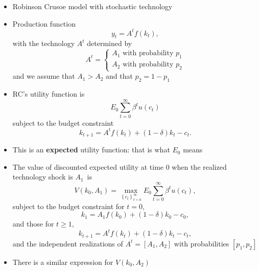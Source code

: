 \documentclass[notes=show]{beamer}
\begin{document}
\begin{frame}%


\begin{itemize}
\item Robinson Crusoe model with stochastic technology

\item Production function%
\[
y_{t}=A^{t}f(k_{t}), 
\]%
with the technology $A^{t}$ determined by 
\[
A^{t}=\left\{ 
\begin{array}{c}
A_{1}\text{ with probability }p_{1} \\ 
A_{2}\text{ with probability }p_{2}%
\end{array}%
\right. 
\]%
and we assume that $A_{1}>A_{2}$ and that $p_{2}=1-p_{1}$

\item RC's utility function is%
\[
E_{0}\sum_{t=0}^{\infty }\beta ^{t}u(c_{t}) 
\]%
subject to the budget constraint%
\[
k_{t+1}=A^{t}f(k_{t})+(1-\delta )k_{t}-c_{t}. 
\]

\item This is an \textbf{expected} utility function: that is what $E_{0}$
means
\end{itemize}

\end{frame}%

\begin{frame}%


\begin{itemize}
\item The value of discounted expected utility at time $0$ when the realized
technology shock is $A_{1}$\ is%
\[
V(k_{0},A_{1})=\max_{\left\{ c_{t}\right\} _{t=0}^{\infty
}}E_{0}\sum_{t=0}^{\infty }\beta ^{t}u(c_{t}),
\]%
subject to the budget constraint for $t=0$,%
\[
k_{1}=A_{1}f(k_{0})+(1-\delta )k_{0}-c_{0},
\]%
and those for $t\geq 1,$%
\[
k_{t+1}=A^{t}f(k_{t})+(1-\delta )k_{t}-c_{t},
\]%
and the independent realizations of $A^{t}=\left[ A_{1},A_{2}\right] $ with
probabilities $\left[ p_{1},p_{2}\right] $

\item There is a similar expression for $V(k_{0},A_{2})$
\end{itemize}

\end{frame}%
\end{document}
